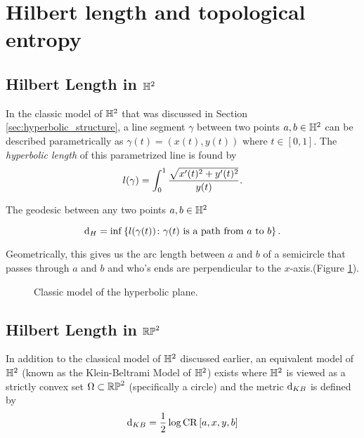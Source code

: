\documentclass{amsart}
\begin{document}
	\section{Hilbert length and topological entropy}
	
	\subsection{Hilbert Length in $\mathbb{H}^2$}
		In the classic model of $\mathbb{H}^2$ that was discussed in Section \ref{sec:hyperbolic_structure}, a line segment $\gamma$ between two points $a,b \in \mathbb{H}^2$ can be described parametrically as $\gamma (t) = (x(t), y(t))$ where $t \in [0,1]$. The \emph{hyperbolic length} of this parametrized line is found by
	\begin{equation}
		\label{eq:hyperbolic_length}
		l(\gamma) = \int_{0}^{1} \frac{\sqrt{x '(t)^2 + y '(t)^2}}{y(t)}.
	\end{equation}
	
	The geodesic between any two points $a, b \in \mathbb{H}^2$
	
	\begin{equation}
		\label{eq:hilbert_length_H2}
		\operatorname{d}_H = \inf \left\{l(\gamma(t)) \colon \gamma(t) \text{ is a path from } a \text{ to } b\right\}.
	\end{equation}
	
	Geometrically, this gives us the arc length between $a$ and $b$ of a semicircle that passes through $a$ and $b$ and who's ends are perpendicular to the $x$-axis.(Figure \ref{fig:hyperbolic_plane}).
	
	\begin{figure}[h]
		\caption{Classic model of the hyperbolic plane.}
		\label{fig:hyperbolic_plane}
	\end{figure}
	
	
	
	\subsection{Hilbert Length in $\mathbb{RP}^2$}
	
	In addition to the classical model of $\mathbb{H}^2$ discussed earlier, an equivalent model of $\mathbb{H}^2$ (known as the Klein-Beltrami Model of $\mathbb{H}^2$) exists where $\mathbb{H}^2$ is viewed as a strictly convex set $\Omega \subset \mathbb{RP}^2$ (specifically a circle) and the metric $\operatorname{d}_{KB}$ is defined by
	\begin{equation*}
		\operatorname{d}_{KB} = \frac{1}{2}\log \operatorname{CR}\left[a,x,y,b\right]
	\end{equation*}
	
\end{document}
